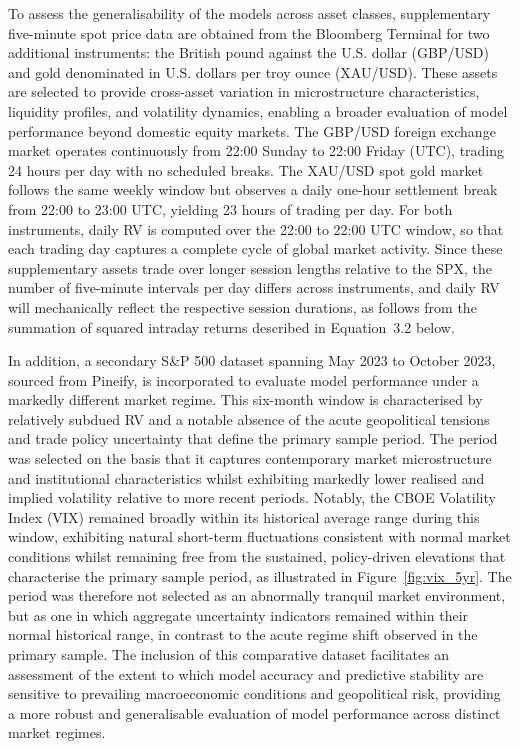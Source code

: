 \documentclass[12pt,a4paper]{report}
\begin{document}
To assess the generalisability of the models across asset classes, supplementary five-minute spot price data are obtained from the Bloomberg Terminal for two additional instruments: the British pound against the U.S. dollar (GBP/USD) and gold denominated in U.S. dollars per troy ounce (XAU/USD). These assets are selected to provide cross-asset variation in microstructure characteristics, liquidity profiles, and volatility dynamics, enabling a broader evaluation of model performance beyond domestic equity markets. The GBP/USD foreign exchange market operates continuously from 22:00 Sunday to 22:00 Friday (UTC), trading 24 hours per day with no scheduled breaks. The XAU/USD spot gold market follows the same weekly window but observes a daily one-hour settlement break from 22:00 to 23:00 UTC, yielding 23 hours of trading per day. For both instruments, daily RV is computed over the 22:00 to 22:00 UTC window, so that each trading day captures a complete cycle of global market activity. Since these supplementary assets trade over longer session lengths relative to the SPX, the number of five-minute intervals per day differs across instruments, and daily RV will mechanically reflect the respective session durations, as follows from the summation of squared intraday returns described in Equation~3.2 below.

In addition, a secondary S\&P 500 dataset spanning May 2023 to October 2023, sourced from Pineify, is incorporated to evaluate model performance under a markedly different market regime. This six-month window is characterised by relatively subdued RV and a notable absence of the acute geopolitical tensions and trade policy uncertainty that define the primary sample period. The period was selected on the basis that it captures contemporary market microstructure and institutional characteristics whilst exhibiting markedly lower realised and implied volatility relative to more recent periods. Notably, the CBOE Volatility Index (VIX) remained broadly within its historical average range during this window, exhibiting natural short-term fluctuations consistent with normal market conditions whilst remaining free from the sustained, policy-driven elevations that characterise the primary sample period, as illustrated in Figure~\ref{fig:vix_5yr}. The period was therefore not selected as an abnormally tranquil market environment, but as one in which aggregate uncertainty indicators remained within their normal historical range, in contrast to the acute regime shift observed in the primary sample. The inclusion of this comparative dataset facilitates an assessment of the extent to which model accuracy and predictive stability are sensitive to prevailing macroeconomic conditions and geopolitical risk, providing a more robust and generalisable evaluation of model performance across distinct market regimes.
\end{document}
